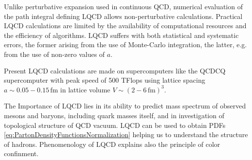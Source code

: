 Unlike perturbative expansion used in continuous QCD, numerical evaluation of
the path integral defining LQCD allows non-perturbative calculations.  Practical
LQCD calculations are limited by the availability of computational resources and
the efficiency of algorithms. LQCD suffers with both statistical and systematic
errors, the former arising from the use of Monte-Carlo integration, the latter,
e.g. from the use of non-zero values of $a$.

Present LQCD calculations are made on supercomputers like the QCDCQ
supercomputer \cite{SuperComputer} with peak speed of 500 TFlops using lattice
spacing $a \sim 0.05 - 0.15 \, \text{fm}$ in lattice volume $V \sim (2 - 6
\,\text{fm} )^3$.

The Importance of LQCD lies in its ability to predict mass spectrum of observed
mesons and baryons, including quark masses itself, and in investigation of
topological structure of QCD vacuum.  LQCD can be used to obtain PDFs
\eqref{eq:PartonDensityFunctionsNormalization} helping us to understand the
structure of hadrons. Phenomenology of LQCD explains also the principle of color
confinment. 


